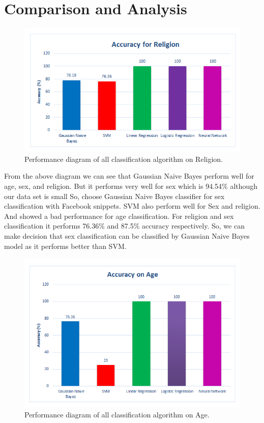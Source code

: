 \documentclass{standalone}
\begin{document}
\section{Comparison and Analysis}
\begin{figure}[h]
				\centering
				\includegraphics[scale=0.8]{./img/Areligion}
				\caption{Performance diagram of all classification algorithm on Religion.} \label{fig:mapComp}
\end{figure}
From the above diagram we can see that Gaussian Naive Bayes perform well for age, sex, and religion. But it performs very well for sex which is 94.54\% although our data set is small So, choose Gaussian Naive Bayes classifier for sex classification with Facebook snippets. SVM also perform well for Sex and religion. And showed a bad performance for age classification. For religion and sex classification it performs 76.36\% and 87.5\% accuracy respectively. So, we can make decision that sex classification can be classified by Gaussian Naive Bayes model as it performs better than SVM.\\
\begin{figure}[h]
				\centering
				\includegraphics[scale=0.8]{./img/Aage}
				\caption{Performance diagram of all classification algorithm on Age.} \label{fig:mapComp}
\end{figure}
\end{document}

